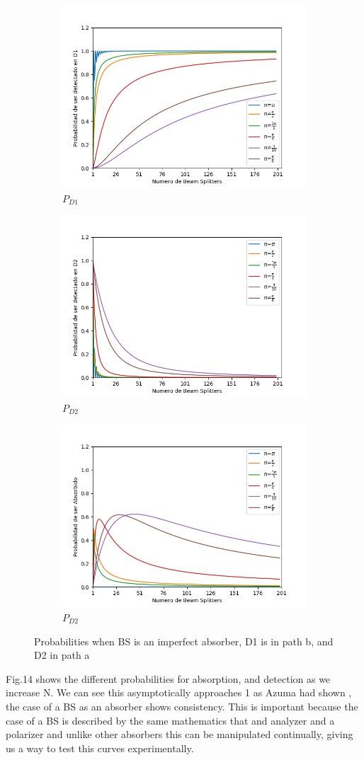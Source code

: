 \documentclass[12pt]{book}
\begin{document}
 
\begin{figure}[h]
\centering
\begin{subfigure}[b]{0.3\linewidth}
\includegraphics[width=\linewidth,height=5 cm]{images/BS_Azuna.png}
\caption{$P_{D1}$}
\label{fig:BS1}
\end{subfigure}
\begin{subfigure}[b]{0.3\linewidth}
\includegraphics[width=\linewidth,height=5 cm]{images/BS_AzunaD2.png}
\caption{$P_{D2}$}
\label{fig:westminster_aerea}
\end{subfigure}
\begin{subfigure}[b]{0.3\linewidth}
\includegraphics[width=\linewidth,height=5 cm]{images/absorbido_azuna.png}
\caption{$P_{D2}$}
\label{fig:BS1}
\end{subfigure}
\caption{Probabilities when BS is an imperfect absorber, D1 is in path b, and D2 in path a}
\label{fig:westminster}
\end{figure} 


Fig.14 shows the different probabilities for absorption, and detection as we increase N. We can see this asymptotically approaches 1 as Azuma had shown \cite{Azuma}, the case of a BS as an absorber shows consistency. This is important because the case of a BS is described by the same mathematics that and analyzer and a polarizer \cite{objetos_leonhardt} and unlike other absorbers this can be manipulated continually, giving us a way to test this curves experimentally.
 
\end{document}
